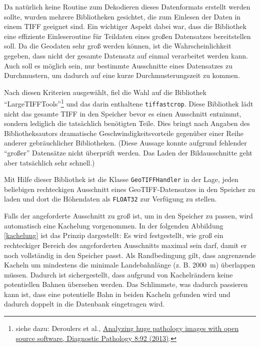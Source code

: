 \documentclass[10pt,a4paper]{report}
\begin{document}
Da natürlich keine Routine zum Dekodieren dieses Datenformats erstellt werden sollte, wurden mehrere Bibliotheken gesichtet, die zum Einlesen der Daten in einem TIFF geeignet sind. Ein wichtiger Aspekt dabei war, dass die Bibliothek eine effiziente Einleseroutine für Teildaten eines großen Datensatzes bereitstellen soll. Da die Geodaten sehr groß werden können, ist die Wahrscheinlichkeit gegeben, dass nicht der gesamte Datensatz auf einmal verarbeitet werden kann. Auch soll es möglich sein, nur bestimmte Ausschnitte eines Datensatzes zu Durchmustern, um dadurch auf eine kurze Durchmusterungszeit zu kommen.

Nach diesen Kriterien ausgewählt, fiel die Wahl auf die Bibliothek "`LargeTIFFTools"'\footnote{siehe dazu: Deroulers et al., \href{http://www.diagnosticpathology.org/content/8/1/92}{Analyzing huge pathology images with open source software, Diagnostic Pathology 8:92 (2013)}.} und das darin enthaltene \texttt{tiffastcrop}. Diese Bibliothek lädt nicht das gesamte TIFF in den Speicher bevor es einen Ausschnitt entnimmt, sondern lediglich die tatsächlich benötigten Teile. Dies bringt nach Angaben des Bibliotheksautors dramatische Geschwindigkeitsvorteile gegenüber einer Reihe anderer gebräuchlicher Bibliotheken. (Diese Aussage konnte aufgrund fehlender "`großer"' Datensätze nicht überprüft werden. Das Laden der Bildausschnitte geht aber tatsächlich sehr schnell.) 

Mit Hilfe dieser Bibliothek ist die Klasse \texttt{GeoTIFFHandler} in der Lage, jeden beliebigen rechteckigen Ausschnitt eines GeoTIFF-Datensatzes in den Speicher zu laden und dort die Höhendaten als \texttt{FLOAT32} zur Verfügung zu stellen.

Falls der angeforderte Ausschnitt zu groß ist, um in den Speicher zu passen, wird automatisch eine Kachelung vorgenommen.
In der folgenden Abbildung \ref{kachelung} ist das Prinzip dargestellt: Es wird festgestellt, wie groß ein rechteckiger Bereich des angeforderten Ausschnitts maximal sein darf, damit er noch vollständig in den Speicher passt. Als Randbedingung gilt, dass angrenzende Kacheln um mindestens die minimale Landebahnlänge (z. B. 2000~m) überlappen müssen. Dadurch ist sichergestellt, dass aufgrund von Kachelrändern keine potentiellen Bahnen übersehen werden. Das Schlimmste, was dadurch passieren kann ist, dass eine potentielle Bahn in beiden Kacheln gefunden wird und dadurch doppelt in die Datenbank eingetragen wird.
\end{document}
